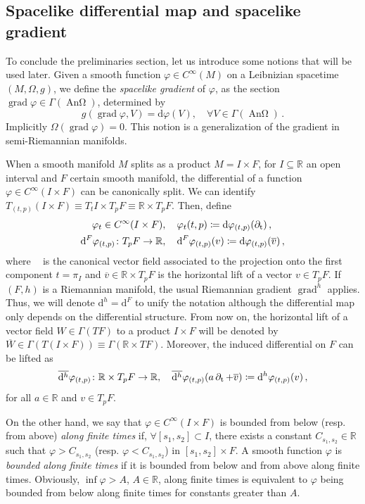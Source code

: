 \documentclass[12pt]{article}
\newcommand{\diff}{\mathrm{d}}
\newcommand{\coloneq}{\vcentcolon\mathrel{\mkern -1.2mu}\mathrel{=}}
\DeclareMathOperator{\pt}{\partial_t}
\DeclareMathOperator{\An}{\text{An}\Omega}
\DeclareMathOperator{\grad}{grad}
\def\R{\mathbb R}
\begin{document}
\subsection{Spacelike differential map and spacelike gradient}
\label{subsection:gradient}
To conclude the preliminaries section, let us introduce some notions that will be used later. Given a smooth function $\varphi\in C^\infty (M)$ on a Leibnizian spacetime $(M, \Omega, g)$, we  define the \textit{spacelike gradient} of $\varphi$, as the section $\grad \varphi\in \Gamma(\An)$, determined by
\[
    g(\grad\varphi, V) = \diff \varphi(V) , \quad \forall V\in \Gamma(\An)\,.
\]
Implicitly $\Omega(\grad \varphi) = 0$. This notion is a generalization of the gradient in semi-Riemannian manifolds.

When a smooth manifold $M$ splits as a product $M=I\times F$, for $I\subseteq \R$ an open interval and $F$ certain smooth manifold, the differential of a function $\varphi\in C^\infty(I \times F)$ can be canonically split. We can identify $T_{(t,p)} (I\times F) \equiv T_t I \times T_p F \equiv \R \times T_p F$. Then, define 
\[
\begin{split}
    \varphi_t\in C^\infty(I\times F), \quad{}& \varphi_t (t,p) \coloneq \diff \varphi_{(t,p)}(\pt)\,,\\
    \diff^F \varphi_{(t,p)}\colon T_pF\to \R, \quad{}& \diff^F \varphi_{(t,p)}(v) \coloneq \diff \varphi_{(t,p)}(\overline{v})\,,
\end{split}
\]
where $\pt$ is the canonical vector field associated to the projection onto the first component $t=\pi_I$ and $\overline{v}\in \R\times T_pF$ is the horizontal lift of a vector $v\in T_pF$. If $(F,h)$ is a Riemannian manifold, the usual Riemannian gradient $\grad^h$ applies. Thus, we will denote $\diff^h = \diff^F$ to unify the notation although the differential map only depends on the differential structure. From now on, the horizontal lift of a vector field $W\in \Gamma(TF)$ to a product $I\times F$ will be denoted by $\overline{W} \in \Gamma(T(I\times F)) \equiv \Gamma(\R \times TF)$. Moreover, the induced differential on $F$ can be lifted as 
\[
    \overline{\diff^h} \varphi_{(t,p)} \colon \R \times T_pF \to \R, \quad \overline{\diff^h} \varphi_{(t,p)}(a\pt + \overline{v}) \coloneq \diff^h \varphi_{(t,p)}(v)\,,
\]
for all $a\in \R$ and $v\in T_pF$.

On the other hand, we say that $\varphi\in C^\infty(I\times F)$ is bounded from below (resp. from above) \textit{along finite times} if, $\forall [s_1,s_2]\subset I$, there exists a constant $C_{s_1,s_2}\in \R$ such that $\varphi >C_{s_1,s_2}$ (resp. $\varphi <C_{s_1,s_2}$) in $[s_1,s_2]\times F$. A smooth function $\varphi$ is \textit{bounded along finite times} if it is bounded from below and from above along finite times. Obviously, $\inf \varphi>A$, $A\in \R$, along finite times is equivalent to $\varphi$ being bounded from below along finite times for constants greater than $A$.
\end{document}
